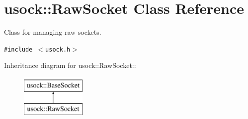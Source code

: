 \hypertarget{classusock_1_1RawSocket}{
\section{usock::RawSocket Class Reference}
\label{classusock_1_1RawSocket}
}
Class for managing raw sockets.  


{\tt \#include $<$usock.h$>$}

Inheritance diagram for usock::RawSocket::\begin{figure}[H]
\begin{center}
\leavevmode
\includegraphics[height=2cm]{classusock_1_1RawSocket}
\end{center}
\end{figure}
